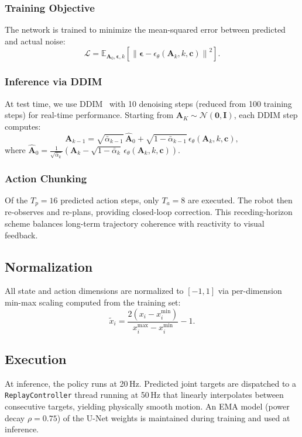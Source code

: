 \documentclass[conference]{IEEEtran}
\begin{document}
\subsubsection{Training Objective}
The network is trained to minimize the mean-squared error between predicted and actual noise:
\begin{equation}
\label{eq:loss}
\mathcal{L} = \mathbb{E}_{\mathbf{A}_0,\boldsymbol\epsilon,k}\left[\left\|\boldsymbol\epsilon - \epsilon_\theta(\mathbf{A}_k, k, \mathbf{c})\right\|^2\right].
\end{equation}

\subsubsection{Inference via DDIM}
At test time, we use DDIM~\cite{song2020ddim} with 10 denoising steps (reduced from 100 training steps) for real-time performance. Starting from $\mathbf{A}_K \sim \mathcal{N}(\mathbf{0},\mathbf{I})$, each DDIM step computes:
\begin{equation}
\label{eq:ddim}
\mathbf{A}_{k-1} = \sqrt{\bar\alpha_{k-1}}\,\hat{\mathbf{A}}_0 + \sqrt{1-\bar\alpha_{k-1}}\,\epsilon_\theta(\mathbf{A}_k, k, \mathbf{c}),
\end{equation}
where $\hat{\mathbf{A}}_0 = \frac{1}{\sqrt{\bar\alpha_k}}\left(\mathbf{A}_k - \sqrt{1-\bar\alpha_k}\,\epsilon_\theta(\mathbf{A}_k, k, \mathbf{c})\right)$.

\subsubsection{Action Chunking}
Of the $T_p = 16$ predicted action steps, only $T_a = 8$ are executed. The robot then re-observes and re-plans, providing closed-loop correction. This receding-horizon scheme balances long-term trajectory coherence with reactivity to visual feedback.

\subsection{Normalization}
All state and action dimensions are normalized to $[-1, 1]$ via per-dimension min-max scaling computed from the training set:
\begin{equation}
\label{eq:norm}
\tilde{x}_i = \frac{2(x_i - x_i^\mathrm{min})}{x_i^\mathrm{max} - x_i^\mathrm{min}} - 1.
\end{equation}

\subsection{Execution}
At inference, the policy runs at 20\,Hz. Predicted joint targets are dispatched to a \texttt{ReplayController} thread running at 50\,Hz that linearly interpolates between consecutive targets, yielding physically smooth motion. An EMA model (power decay $\rho = 0.75$) of the U-Net weights is maintained during training and used at inference.
\end{document}
